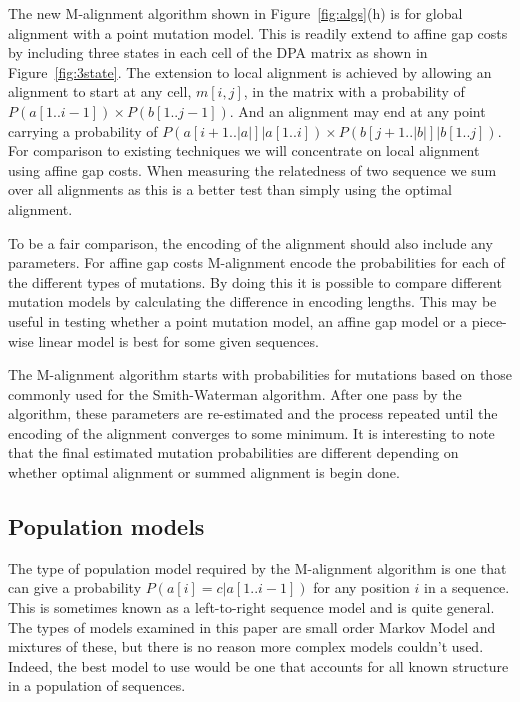 \documentclass[letterpaper,11pt,oneside]{article}
\begin{document}
The new M-alignment algorithm shown in Figure~\ref{fig:algs}(h) is for global
alignment with a point mutation model.  This is readily extend to affine gap
costs by including three states in each cell of the DPA matrix as shown in
Figure~\ref{fig:3state}.  The extension to local alignment is achieved by
allowing an alignment to start at any cell, $m[i,j]$, in the matrix with a
probability of $P(a[1..i-1]) \times P(b[1..j-1])$.  And an alignment may end at
any point carrying a probability of $P(a[i+1..|a|] | a[1..i]) \times P(b[j+1..|b|]
| b[1..j])$.  For comparison to existing techniques we will concentrate on
local alignment using affine gap costs.  When measuring the relatedness of two
sequence we sum over all alignments as this is a better test than simply using
the optimal alignment.

To be a fair comparison, the encoding of the alignment should also include any
parameters.  For affine gap costs M-alignment encode the probabilities for
each of the different types of mutations.  By doing this it is possible to
compare different mutation models by calculating the difference in encoding
lengths.  This may be useful in testing whether a point mutation model, an
affine gap model or a piece-wise linear model is best for some given
sequences.

The M-alignment algorithm starts with probabilities for mutations based on
those commonly used for the Smith-Waterman algorithm.  After one pass by the
algorithm, these parameters are re-estimated and the process repeated until
the encoding of the alignment converges to some minimum.  It is interesting to
note that the final estimated mutation probabilities are different depending
on whether optimal alignment or summed alignment is begin done.



\subsection{Population models}

The type of population model required by the M-alignment algorithm is one that
can give a probability $P(a[i]=c|a[1..i-1])$ for any position $i$ in a
sequence.  This is sometimes known as a left-to-right sequence model and is
quite general.  The types of models examined in this paper are small order
Markov Model and mixtures of these, but there is no reason more complex models
couldn't used.  Indeed, the best model to use would be one that accounts for
all known structure in a population of sequences.
\end{document}
